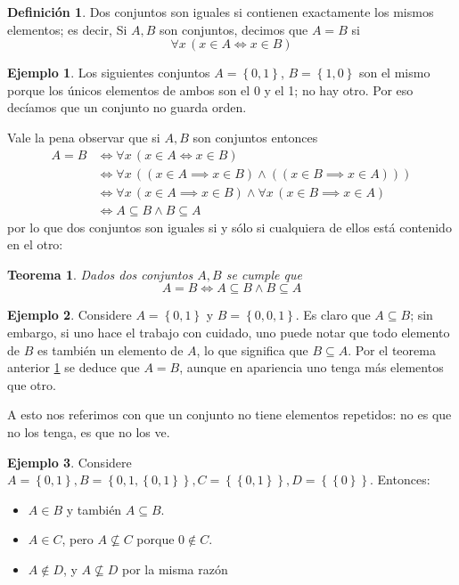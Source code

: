 \documentclass{book}
\newcommand{\set}[1]{\left\lbrace #1 \right\rbrace }
\newtheorem{thm}{Teorema}[chapter]
\theoremstyle{definition}
\newtheorem{df}{Definición}[chapter]
\newtheorem{ejm}{Ejemplo}[chapter]
\begin{document}
\begin{df}
	Dos conjuntos son iguales si contienen exactamente los mismos elementos; es decir,
	Si $A,B$ son conjuntos, decimos que $A=B$ si \[\forall x \, \left(x\in A \iff x \in B \right) \]
\end{df}

\begin{ejm}
	Los siguientes conjuntos $A=\set{0,1}$, $B=\set{1,0}$ son el mismo porque los únicos elementos de ambos son el 0 y el 1; no hay otro. Por eso decíamos que un conjunto no guarda orden.
\end{ejm}

Vale la pena observar que si $A,B$ son conjuntos entonces 
\begin{align*}
	A = B 
	&\iff \forall x\, \left(x\in A \iff x \in B\right)\\
	&\iff  \forall x\, \left( (x\in A \implies x \in B) \wedge ((x\in B \implies x \in A))\right) \\
	&\iff \forall x\, (x\in A \implies x \in B) \wedge \forall x\, (x\in B \implies x \in A)\\
	&\iff A \subseteq B \wedge B \subseteq A
\end{align*}
por lo que dos conjuntos son iguales si y sólo si cualquiera de ellos está contenido en el otro:
\begin{thm}\label{thm_igualdadConjuntos}
	Dados dos conjuntos $A,B$ se cumple que
	\[A = B \iff A \subseteq B \wedge B \subseteq A \]
\end{thm}

\begin{ejm}
	Considere $A = \set{0,1}$ y $B=\set{0,0,1}$. Es claro que $A \subseteq B$; sin embargo, si uno hace el trabajo con cuidado, uno puede notar que todo elemento de $B$ es también un elemento de $A$, lo que significa que $B \subseteq A$.
	Por el teorema anterior \ref{thm_igualdadConjuntos} se deduce que $A=B$, aunque en apariencia uno tenga más elementos que otro.
	
	A esto nos referimos con que un conjunto no tiene elementos repetidos: no es que no los tenga, es que no los ve.
\end{ejm}


\begin{ejm}
	Considere $A=\set{0,1}, B=\set{0,1,\set{0,1}}, C=\set{\set{0,1}}, D= \set{\set{0}}$. Entonces:
	\begin{itemize}
		\item $A\in B$ y también $A\subseteq B$.
		\item $A\in C$, pero $A \not \subseteq C$ porque $0 \notin C$.
		\item $A\notin D$, y $A\not \subseteq D$ por la misma razón
	\end{itemize}
\end{ejm}
\end{document}
